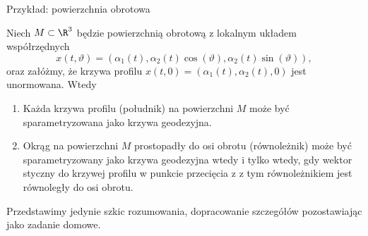\begin{frame}[<+->]{Przykład: powierzchnia obrotowa}
\begin{wniosek}
Niech $M\subset \R^3$ będzie powierzchnią obrotową z lokalnym układem współrzędnych
\[x(t,\vartheta)=(\alpha_1(t),\alpha_2(t)\cos(\vartheta),\alpha_2(t)\sin(\vartheta)),\]
oraz załóżmy, że krzywa profilu $x(t,0)=(\alpha_1(t),\alpha_2(t),0)$ jest unormowana. Wtedy 
\begin{enumerate}
\item Każda krzywa profilu (południk) na powierzchni $M$ może być sparametryzowana jako krzywa geodezyjna.
\item Okrąg na powierzchni $M$ prostopadły do osi obrotu (równoleżnik) może być sparametryzowany jako krzywa geodezyjna wtedy i tylko wtedy, gdy wektor styczny do krzywej profilu w punkcie przecięcia z z tym równoleżnikiem jest równoległy do osi obrotu.
\end{enumerate}
\end{wniosek}

\end{frame}
\begin{frame}

\begin{center}

\end{center}

\end{frame}

Przedstawimy jedynie szkic rozumowania, dopracowanie szczegółów pozostawiając jako zadanie domowe.

